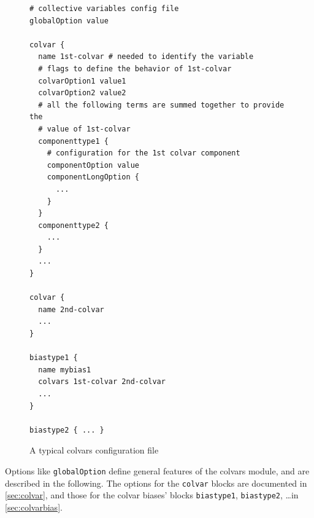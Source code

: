 \begin{figure}[!ht]
  \footnotesize
\begin{verbatim}
# collective variables config file
globalOption value

colvar {
  name 1st-colvar # needed to identify the variable
  # flags to define the behavior of 1st-colvar
  colvarOption1 value1
  colvarOption2 value2
  # all the following terms are summed together to provide the
  # value of 1st-colvar
  componenttype1 {
    # configuration for the 1st colvar component
    componentOption value
    componentLongOption {
      ...
    }
  }
  componenttype2 {
    ...
  }
  ...
}

colvar {
  name 2nd-colvar
  ...
}

biastype1 {
  name mybias1
  colvars 1st-colvar 2nd-colvar
  ...
}

biastype2 { ... }
\end{verbatim}
  \caption{A typical colvars configuration file}
  \label{fig:colvars_config}
\end{figure}

Options like \texttt{globalOption} define general features of the
colvars module, and are described in the following.  The options for
the \texttt{colvar} blocks are documented in \ref{sec:colvar}, and
those for the colvar biases' blocks \texttt{biastype1},
\texttt{biastype2}, \ldots in \ref{sec:colvarbias}.

